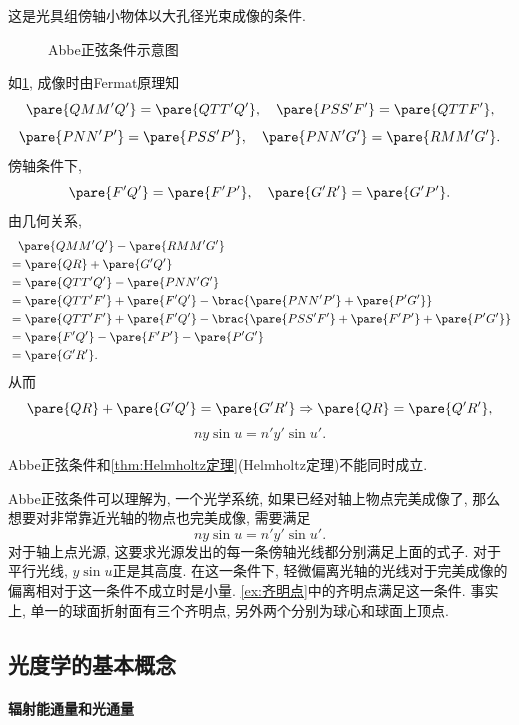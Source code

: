 \documentclass{ctexart}
\begin{document}
这是光具组傍轴小物体以大孔径光束成像的条件.
\begin{figure}[ht]
    \centering
    \caption{Abbe正弦条件示意图}
    \label{fig:abbe正弦条件示意图}
\end{figure}
如\cref{fig:abbe正弦条件示意图}, 成像时由Fermat原理知
\[ \pare{QMM'Q'} = \pare{QTT'Q'}, \quad \pare{PSS'F'} = \pare{QTTF'}, \]
\[ \pare{PNN'P'} = \pare{PSS'P'},\quad \pare{PNN'G'} = \pare{RMM'G'}. \]
傍轴条件下,
\[ \pare{F'Q'} = \pare{F'P'},\quad \pare{G'R'} = \pare{G'P'}. \]
由几何关系,
\begin{align*}
    & \phantom{ = } \pare{QMM'Q'} - \pare{RMM'G'}\\
    &= \pare{QR} + \pare{G'Q'} \\
    &= \pare{QTT'Q'} - \pare{PNN'G'} \\
    &= \pare{QTT'F'} + \pare{F'Q'} - \brac{\pare{PNN'P'} + \pare{P'G'}} \\
    &= \pare{QTT'F'} + \pare{F'Q'} - \brac{\pare{PSS'F'} + \pare{F'P'} + \pare{P'G'}} \\
    &= \pare{F'Q'} - \pare{F'P'} - \pare{P'G'}\\
    &= \pare{G'R'}.
\end{align*}
从而
\[ \pare{QR} + \pare{G'Q'} = \pare{G'R'}\Rightarrow \pare{QR} = \pare{Q'R'}, \]
\[ ny\sin u = n'y'\sin u'. \]
\begin{remark}
    Abbe正弦条件和\cref{thm:Helmholtz定理}(Helmholtz定理)不能同时成立.
\end{remark}
Abbe正弦条件可以理解为, 一个光学系统, 如果已经对轴上物点完美成像了, 那么想要对非常靠近光轴的物点也完美成像, 需要满足
\[ ny\sin u = n'y'\sin u'. \]
对于轴上点光源, 这要求光源发出的每一条傍轴光线都分别满足上面的式子. 对于平行光线, $y\sin u$正是其高度. 在这一条件下, 轻微偏离光轴的光线对于完美成像的偏离相对于这一条件不成立时是小量. \cref{ex:齐明点}中的齐明点满足这一条件. 事实上, 单一的球面折射面有三个齐明点, 另外两个分别为球心和球面上顶点.




\subsection{光度学的基本概念} %
\label{sub:光度学的基本概念}

\paragraph{辐射能通量和光通量} %
\label{par:辐射能通量和光通量}
\end{document}
